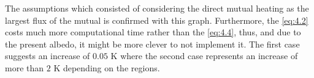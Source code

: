 The assumptions which consisted of considering the direct mutual heating as the largest flux of the mutual is confirmed with this graph. Furthermore, the \autoref{eq:4.2} costs much more computational time rather than the \autoref{eq:4.4}, thus, and due to the present albedo, it might be more clever to not implement it. The first case suggests an increase of $0.05$ \si{\kelvin} where the second case represents an increase of more than $2$ \si{\kelvin} depending on the regions.
